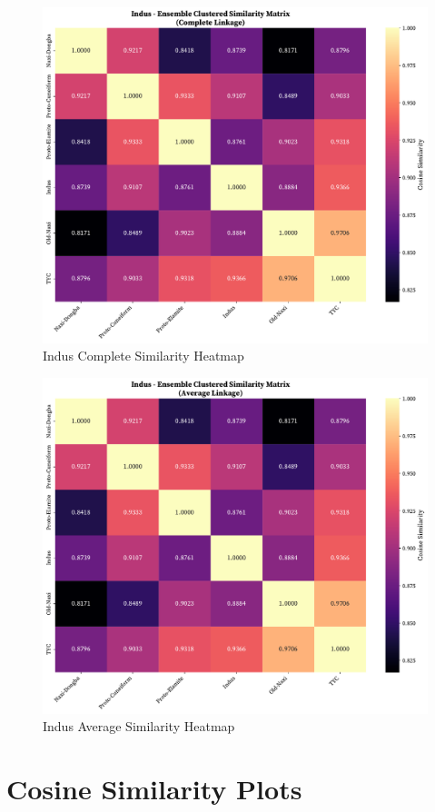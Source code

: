 \documentclass[11pt,a4paper,oneside]{report}
\begin{document}
 \begin{figure}[H]
    \centering
    \includegraphics[width=0.8\linewidth]{Visualizations/Clustered Heatmaps/Indus/ensemble_clustered_similarity_complete.pdf}
     \caption*{Indus Complete Similarity Heatmap}
\end{figure}
 \begin{figure}[H]
    \centering
    \includegraphics[width=0.8\linewidth]{Visualizations/Clustered Heatmaps/Indus/ensemble_clustered_similarity_average.pdf}
     \caption*{Indus Average Similarity Heatmap}
\end{figure}

\section{Cosine Similarity Plots}
\label{app: similarity}
\end{document}
